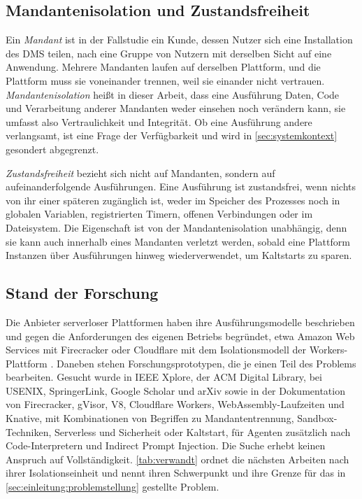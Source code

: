 \subsection{Mandantenisolation und Zustandsfreiheit}
\label{sec:grundlagen:eigenschaften}

Ein \emph{Mandant} ist in der Fallstudie ein Kunde, dessen Nutzer sich eine Installation des \ac{DMS} teilen, nach
\textcite[S.~427]{krebs_architectural_2012} eine Gruppe von Nutzern mit derselben Sicht auf eine Anwendung. Mehrere
Mandanten laufen auf derselben Plattform, und die Plattform muss sie voneinander trennen, weil sie einander nicht
vertrauen. \emph{Mandantenisolation} heißt in dieser
Arbeit, dass eine Ausführung Daten, Code und Verarbeitung anderer Mandanten weder einsehen noch
verändern kann, sie umfasst also Vertraulichkeit und Integrität. Ob eine Ausführung andere verlangsamt, ist eine
Frage der Verfügbarkeit und wird in \autoref{sec:systemkontext} gesondert abgegrenzt.

\emph{Zustandsfreiheit} bezieht sich nicht auf Mandanten, sondern auf aufeinanderfolgende
Ausführungen. Eine Ausführung ist zustandsfrei, wenn nichts von ihr einer späteren zugänglich ist,
weder im Speicher des Prozesses noch in globalen Variablen, registrierten Timern, offenen
Verbindungen oder im Dateisystem. Die Eigenschaft ist von der Mandantenisolation unabhängig, denn
sie kann auch innerhalb eines Mandanten verletzt werden, sobald eine Plattform Instanzen über
Ausführungen hinweg wiederverwendet, um Kaltstarts zu sparen.

\subsection{Stand der Forschung}
\label{sec:grundlagen:stand}

Die Anbieter serverloser Plattformen haben ihre Ausführungsmodelle beschrieben und gegen die Anforderungen des eigenen
Betriebs begründet, etwa Amazon Web Services mit Firecracker \autocite[S.~419]{agache_firecracker_2020} oder Cloudflare
mit dem Isolationsmodell der Workers-Plattform \autocites{bloom_cloud_2018}{cloudflare_security_2026}. Daneben stehen
Forschungsprototypen, die je einen Teil des Problems bearbeiten. Gesucht wurde in IEEE Xplore, der ACM Digital Library, bei USENIX, SpringerLink,
Google Scholar und arXiv sowie in der Dokumentation von Firecracker, gVisor, V8, Cloudflare Workers,
WebAssembly-Laufzeiten und Knative, mit Kombinationen von Begriffen zu Mandantentrennung, Sandbox-Techniken,
Serverless und Sicherheit oder Kaltstart, für Agenten zusätzlich nach Code-Interpretern und Indirect Prompt Injection.
Die Suche erhebt keinen Anspruch auf Vollständigkeit. \autoref{tab:verwandt} ordnet die nächsten Arbeiten
nach ihrer Isolationseinheit und nennt ihren Schwerpunkt und ihre Grenze für das in \autoref{sec:einleitung:problemstellung} gestellte Problem.

